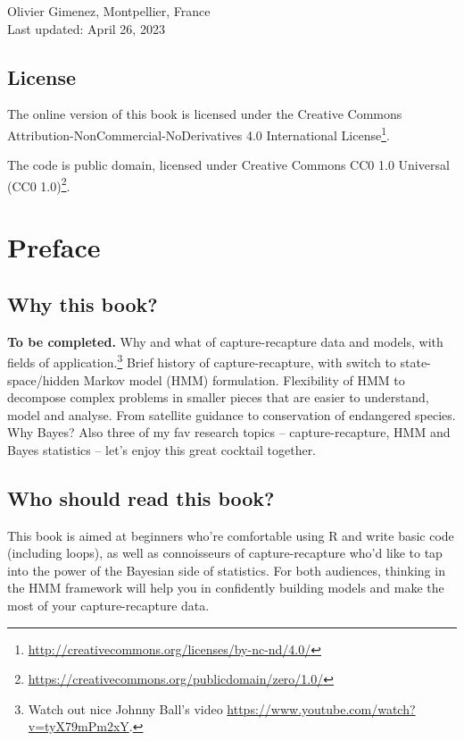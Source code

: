 \documentclass[
  12pt,
]{krantz}
\renewcommand{\href}[2]{#2\footnote{\url{#1}}}
\begin{document}
Olivier Gimenez, Montpellier, France\\
Last updated: April 26, 2023

\hypertarget{license}{%
\section*{License}\label{license}}


The online version of this book is licensed under the \href{http://creativecommons.org/licenses/by-nc-nd/4.0/}{Creative Commons Attribution-NonCommercial-NoDerivatives 4.0 International License}.

The code is public domain, licensed under \href{https://creativecommons.org/publicdomain/zero/1.0/}{Creative Commons CC0 1.0 Universal (CC0 1.0)}.

\hypertarget{preface}{%
\chapter*{Preface}\label{preface}}


\hypertarget{why-this-book}{%
\section*{Why this book?}\label{why-this-book}}


\textbf{To be completed.} Why and what of capture-recapture data and models, with fields of application.\footnote{Watch out nice Johnny Ball's video \url{https://www.youtube.com/watch?v=tyX79mPm2xY}.} Brief history of capture-recapture, with switch to state-space/hidden Markov model (HMM) formulation. Flexibility of HMM to decompose complex problems in smaller pieces that are easier to understand, model and analyse. From satellite guidance to conservation of endangered species. Why Bayes? Also three of my fav research topics -- capture-recapture, HMM and Bayes statistics -- let's enjoy this great cocktail together.

\hypertarget{who-should-read-this-book}{%
\section*{Who should read this book?}\label{who-should-read-this-book}}


This book is aimed at beginners who're comfortable using R and write basic code (including loops), as well as connoisseurs of capture-recapture who'd like to tap into the power of the Bayesian side of statistics. For both audiences, thinking in the HMM framework will help you in confidently building models and make the most of your capture-recapture data.
\end{document}
